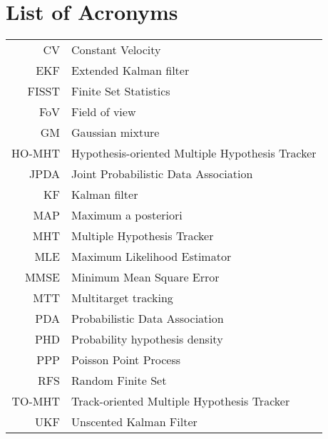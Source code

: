 \chapter{List of Acronyms}

\begin{tabular}{rl}
CV & Constant Velocity \\
EKF & Extended Kalman filter \\
FISST & Finite Set Statistics \\
FoV & Field of view \\
GM & Gaussian mixture \\
HO-MHT & Hypothesis-oriented Multiple Hypothesis Tracker \\
JPDA & Joint Probabilistic Data Association \\
KF & Kalman filter \\
MAP & Maximum a posteriori \\
MHT & Multiple Hypothesis Tracker \\
MLE & Maximum Likelihood Estimator \\
MMSE & Minimum Mean Square Error \\
MTT & Multitarget tracking \\
PDA & Probabilistic Data Association \\
PHD & Probability hypothesis density \\
PPP & Poisson Point Process \\
RFS & Random Finite Set \\
TO-MHT & Track-oriented Multiple Hypothesis Tracker \\
UKF & Unscented Kalman Filter \\
\end{tabular}
